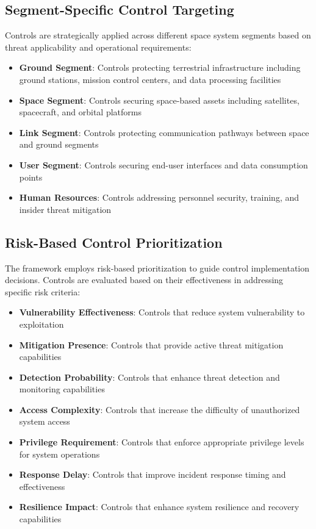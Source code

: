 \documentclass[binding=0.6cm]{sapthesis}
\begin{document}
\subsection{Segment-Specific Control Targeting}

Controls are strategically applied across different space system segments based on threat applicability and operational requirements:

\begin{itemize}
    \item \textbf{Ground Segment}: Controls protecting terrestrial infrastructure including ground stations, mission control centers, and data processing facilities
    \item \textbf{Space Segment}: Controls securing space-based assets including satellites, spacecraft, and orbital platforms
    \item \textbf{Link Segment}: Controls protecting communication pathways between space and ground segments
    \item \textbf{User Segment}: Controls securing end-user interfaces and data consumption points
    \item \textbf{Human Resources}: Controls addressing personnel security, training, and insider threat mitigation
\end{itemize}

\subsection{Risk-Based Control Prioritization}

The framework employs risk-based prioritization to guide control implementation decisions. Controls are evaluated based on their effectiveness in addressing specific risk criteria:

\begin{itemize}
    \item \textbf{Vulnerability Effectiveness}: Controls that reduce system vulnerability to exploitation
    \item \textbf{Mitigation Presence}: Controls that provide active threat mitigation capabilities
    \item \textbf{Detection Probability}: Controls that enhance threat detection and monitoring capabilities
    \item \textbf{Access Complexity}: Controls that increase the difficulty of unauthorized system access
    \item \textbf{Privilege Requirement}: Controls that enforce appropriate privilege levels for system operations
    \item \textbf{Response Delay}: Controls that improve incident response timing and effectiveness
    \item \textbf{Resilience Impact}: Controls that enhance system resilience and recovery capabilities
\end{itemize}
\end{document}
